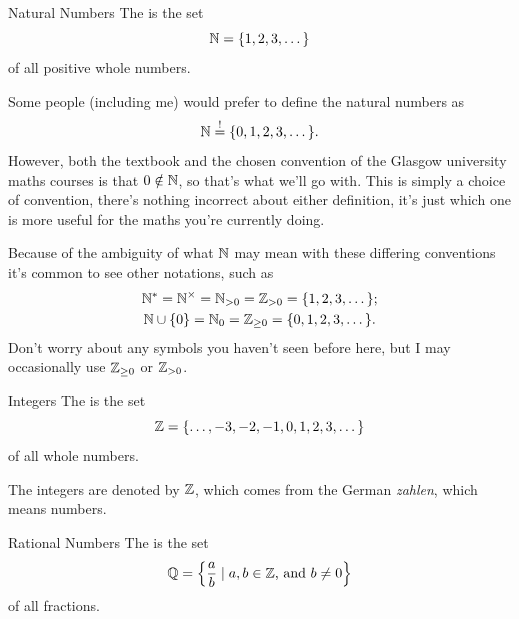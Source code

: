 \documentclass[fleqn]{LectureClass/LectureClass}
\begin{document}
    \begin{dfn}{Natural Numbers}{}
        The  is the set
        \begin{equation}
            \mathbb{N} = \{1, 2, 3, \dotsc\}
        \end{equation}
        of all positive whole numbers.
    \end{dfn}
    \begin{remark}{}{}
        Some people (including me) would prefer to define the natural numbers as
        \begin{equation}
            \mathbb{N} \stackrel{!}{=} \{0, 1, 2, 3, \dotsc\}.
        \end{equation}
        However, both the textbook and the chosen convention of the Glasgow university maths courses is that \(0 \notin \mathbb{N}\), so that's what we'll go with.
        This is simply a choice of convention, there's nothing incorrect about either definition, it's just which one is more useful for the maths you're currently doing.
        
        Because of the ambiguity of what \(\mathbb{N}\) may mean with these differing conventions it's common to see other notations, such as
        \begin{gather}
            \mathbb{N}^{*} = \mathbb{N}^{\times} = \mathbb{N}_{>0} = \mathbb{Z}_{>0} = \{1, 2, 3, \dotsc\};\\
            \mathbb{N} \cup \{0\} = \mathbb{N}_0 = \mathbb{Z}_{\ge 0} = \{0, 1, 2, 3, \dotsc\}.
        \end{gather}
        Don't worry about any symbols you haven't seen before here, but I may occasionally use \(\mathbb{Z}_{\ge 0}\) or \(\mathbb{Z}_{>0}\).
    \end{remark}
    
    \begin{dfn}{Integers}{}
        The  is the set
        \begin{equation}
            \mathbb{Z} = \{\dotsc, -3, -2, -1, 0, 1, 2, 3, \dotsc\}
        \end{equation}
        of all whole numbers.
    \end{dfn}
    
    \begin{remark}{}{}
        The integers are denoted by \(\mathbb{Z}\), which comes from the German \textit{zahlen}, which means numbers.
    \end{remark}
    
    \begin{dfn}{Rational Numbers}{}
        The  is the set
        \begin{equation}
            \mathbb{Q} = \left\{ \frac{a}{b} \mid a, b \in \mathbb{Z} \text{, and } b \ne 0 \right\}
        \end{equation}
        of all fractions.
    \end{dfn}
    
\end{document}
